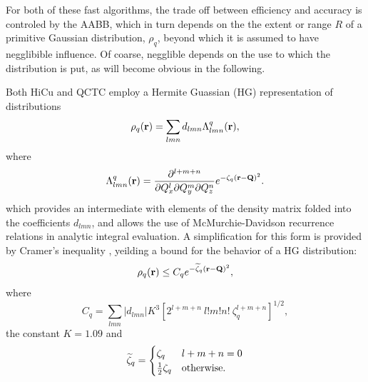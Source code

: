 \commentoutA{\documentclass[prb,aps,twocolumn,showpacs,twocolumngrid,superbib]{revtex4}}
\begin{document}
For both of these fast algorithms, the trade off between efficiency and accuracy is controled by the AABB,  which in turn 
depends on the the extent or range $R$ of a primitive Gaussian distribution, $\rho_q$, beyond which it is assumed to 
have negglibible influence.  Of coarse, negglible depends on the use to which the distribution is put, as will become 
obvious in the following. 

Both HiCu and QCTC employ a Hermite Guassian (HG) representation of distributions
\begin{equation}
\rho_q ({\bf r}) = \sum_{lmn} d_{lmn} \Lambda^q_{lmn}({\bf r}),
\end{equation}
where 
\begin{equation}
\Lambda^q_{lmn}({\bf r}) = \frac{\partial^{l+m+n} }{\partial Q^l_x \partial Q^m_y \partial Q^n_z} e^{-\zeta_q ({\bf r}-{\bf Q})^2}.
\end{equation}
which provides an intermediate with elements of the density matrix folded  into the coefficients $d_{lmn}$, and allows
the use of McMurchie-Davidson recurrence relations in analytic integral evaluation.   
A simplification for this form is provided by Cramer's inequality \cite{}, yeilding a 
bound for the behavior of a HG distribution: 
\begin{equation}
\rho_q ({\bf r})  \leq C_q e^{ -\widetilde \zeta_q ({\bf r -Q})^2 },  
\end{equation}
where
\begin{equation}
C_q=\sum_{lmn} \left|d_{lmn}\right| K^3 \left[ 2^{l+m+n} ~ l! m! n! ~ \zeta^{l+m+n}_q \right]^{1/2} ,
\end{equation}
the constant $K=1.09$ and  
\begin{equation}
\widetilde \zeta_q = 
\begin{cases}
\zeta_q   & l+m+n= 0 \\
\frac{1}{2} \zeta_q   & {\rm otherwise.}
\end{cases}
\end{equation}

\newpage
\newpage
\end{document}

